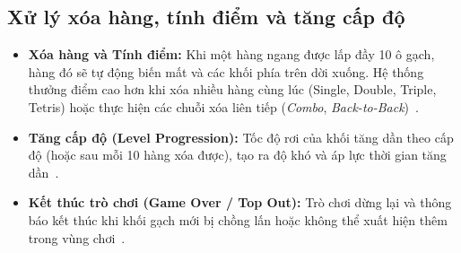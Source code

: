 \subsection{Xử lý xóa hàng, tính điểm và tăng cấp độ}
\begin{itemize}
    \item \textbf{Xóa hàng và Tính điểm:} Khi một hàng ngang được lấp đầy 10 ô gạch, hàng đó sẽ tự động biến mất và các khối phía trên dời xuống. Hệ thống thưởng điểm cao hơn khi xóa nhiều hàng cùng lúc (Single, Double, Triple, Tetris) hoặc thực hiện các chuỗi xóa liên tiếp (\textit{Combo}, \textit{Back-to-Back})~\cite{tetris_scoring}.
    \item \textbf{Tăng cấp độ (Level Progression):} Tốc độ rơi của khối tăng dần theo cấp độ (hoặc sau mỗi 10 hàng xóa được), tạo ra độ khó và áp lực thời gian tăng dần~\cite{tetris_marathon}.
    \item \textbf{Kết thúc trò chơi (Game Over / Top Out):} Trò chơi dừng lại và thông báo kết thúc khi khối gạch mới bị chồng lấn hoặc không thể xuất hiện thêm trong vùng chơi~\cite{tetris_topout}.
\end{itemize}

